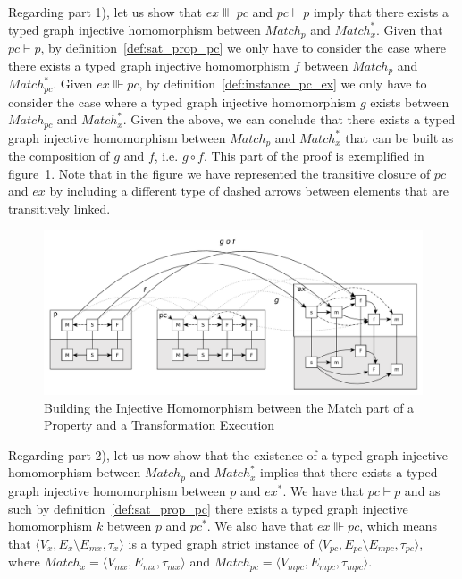 \begin{pf}
Regarding part 1), let us show that $ex\Vvdash pc$ and $pc\vdash p$ imply
that there exists a typed graph injective homomorphism between $Match_p$ and
$Match^{*}_{x}$. Given that $pc\vdash p$, by 
definition~\ref{def:sat_prop_pc} we only have to consider the case where there
exists a typed graph injective homomorphism $f$ between $Match_p$ and
$Match^{*}_{pc}$. 
Given $ex\Vvdash pc$, by definition~\ref{def:instance_pc_ex} we only have to
consider the case where a typed graph injective homomorphism $g$ exists between  
$Match_{pc}$ and $Match^*_x$.
Given the above, we can conclude that there exists a typed graph injective
homomorphism between $Match_p$ and $Match^{*}_{x}$ that can be built as the
composition of $g$ and $f$, i.e. $g\circ f$. This part of the proof is
exemplified in figure~\ref{fig:proof_example_morphism_p_to_ex_match}. Note
that in the figure we have represented the transitive closure of $pc$ and $ex$ by including a different
type of dashed arrows between elements that are transitively linked.%

\begin{figure}[h!] \centering \includegraphics[scale=.35]{./figures/property_proving/proof_example_morphism_p_to_ex.pdf}
	\caption{Building the Injective Homomorphism between the Match part of a Property and a Transformation Execution}
	\label{fig:proof_example_morphism_p_to_ex_match}
\end{figure}

Regarding part 2), let us now show that the existence of a typed graph injective
homomorphism between $Match_p$ and $Match^{*}_{x}$ implies that there exists a
typed graph injective homomorphism between $p$ and $ex^*$. We have that
$pc\vdash p$ and as such by definition~\ref{def:sat_prop_pc} there exists a
typed graph injective homomorphism $k$ between $p$ and $pc^*$. We also have that
$ex\Vvdash pc$, which means that $\langle V_x,E_x\setminus E_{mx},\tau_x\rangle$
is a typed graph strict instance of $\langle V_{pc},E_{pc}\setminus
E_{mpc},\tau_{pc}\rangle$, where $Match_x = \langle V_{mx},E_{mx},\tau_{mx}\rangle$ and $Match_{pc}
= \langle V_{mpc},E_{mpc},\tau_{mpc}\rangle$.


\end{pf}
